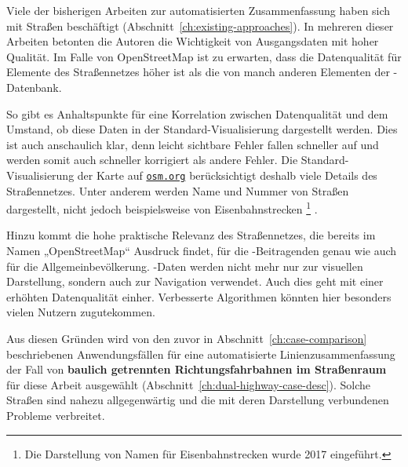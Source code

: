 \documentclass[../main/thesis.tex]{subfiles}
\begin{document}
Viele der bisherigen Arbeiten zur automatisierten Zusammenfassung haben sich mit Straßen beschäftigt (Abschnitt~\ref{ch:existing-approaches}).
In mehreren dieser Arbeiten betonten die Autoren die Wichtigkeit von Ausgangsdaten mit hoher Qualität.
Im Falle von OpenStreetMap ist zu erwarten, dass die Datenqualität für Elemente des Straßennetzes höher ist als die von manch anderen Elementen der \osm-Datenbank.

So gibt es Anhaltspunkte für eine Korrelation zwischen Datenqualität und dem Umstand, ob diese Daten in der Standard-Visualisierung dargestellt werden. 
Dies ist auch anschaulich klar, denn leicht sichtbare Fehler fallen schneller auf und werden somit auch schneller korrigiert als andere Fehler.
Die Standard-Visualisierung der Karte auf \href{https://www.openstreetmap.org/}{\nolinkurl{osm.org}} berücksichtigt deshalb viele Details des Straßennetzes.
Unter anderem werden Name und Nummer von Straßen dargestellt, nicht jedoch beispielsweise von Eisenbahnstrecken%
\footnote{Die Darstellung von Namen für Eisenbahnstrecken wurde 2017 eingeführt.}%
.

Hinzu kommt die hohe praktische Relevanz des Straßennetzes, die bereits im Namen „OpenStreetMap“ Ausdruck findet, für die \osm-Beitragenden genau wie auch für die Allgemeinbevölkerung.
\osm-Daten werden nicht mehr nur zur visuellen Darstellung, sondern auch zur Navigation verwendet.
Auch dies geht mit einer erhöhten Datenqualität einher. 
Verbesserte Algorithmen könnten hier besonders vielen Nutzern zugutekommen.

Aus diesen Gründen wird von den zuvor in Abschnitt~\ref{ch:case-comparison} beschriebenen Anwendungsfällen für eine automatisierte Linienzusammenfassung der Fall von \textbf{baulich getrennten Richtungsfahrbahnen im Straßenraum} für diese Arbeit ausgewählt (Abschnitt~\ref{ch:dual-highway-case-desc}).
Solche Straßen sind nahezu allgegenwärtig und die mit deren Darstellung verbundenen Probleme verbreitet.
\end{document}
